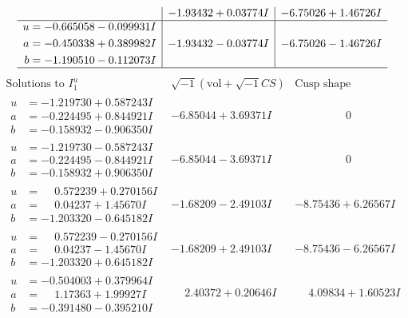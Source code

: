 \documentclass[1p]{elsarticle_modified}
\theoremstyle{definition}
\newcommand{\I}{\sqrt{-1}}
\begin{document}
$$\begin{array}{c|c|c}
 & -1.93432 + 0.03774 I & -6.75026 + 1.46726 I \\ \hline\begin{aligned}
u &= -0.665058 - 0.099931 I \\
a &= -0.450338 + 0.389982 I \\
b &= -1.190510 - 0.112073 I\end{aligned}
 & -1.93432 - 0.03774 I & -6.75026 - 1.46726 I\\
 \hline 
 \end{array}$$\newpage$$\begin{array}{c|c|c}  
\text{Solutions to }I^u_{1}& \I (\text{vol} + \sqrt{-1}CS) & \text{Cusp shape}\\
 \hline 
\begin{aligned}
u &= -1.219730 + 0.587243 I \\
a &= -0.224495 + 0.844921 I \\
b &= -0.158932 - 0.906350 I\end{aligned}
 & -6.85044 + 3.69371 I & \phantom{-0.000000 } 0 \\ \hline\begin{aligned}
u &= -1.219730 - 0.587243 I \\
a &= -0.224495 - 0.844921 I \\
b &= -0.158932 + 0.906350 I\end{aligned}
 & -6.85044 - 3.69371 I & \phantom{-0.000000 } 0 \\ \hline\begin{aligned}
u &= \phantom{-}0.572239 + 0.270156 I \\
a &= \phantom{-}0.04237 + 1.45670 I \\
b &= -1.203320 - 0.645182 I\end{aligned}
 & -1.68209 - 2.49103 I & -8.75436 + 6.26567 I \\ \hline\begin{aligned}
u &= \phantom{-}0.572239 - 0.270156 I \\
a &= \phantom{-}0.04237 - 1.45670 I \\
b &= -1.203320 + 0.645182 I\end{aligned}
 & -1.68209 + 2.49103 I & -8.75436 - 6.26567 I \\ \hline\begin{aligned}
u &= -0.504003 + 0.379964 I \\
a &= \phantom{-}1.17363 + 1.99927 I \\
b &= -0.391480 - 0.395210 I\end{aligned}
 & \phantom{-}2.40372 + 0.20646 I & \phantom{-}4.09834 + 1.60523 I \\ \hline\begin{aligned}

\end{aligned}
\end{array}$$
\end{document}
